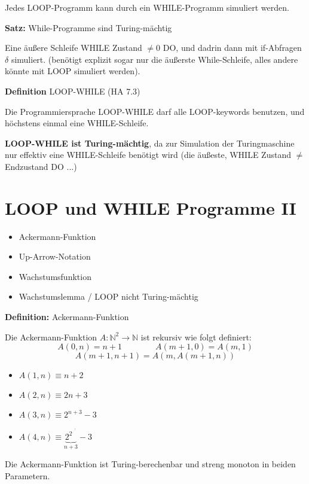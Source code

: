 \documentclass[a4paper,graphics,11pt]{article}
\begin{document}
Jedes LOOP-Programm kann durch ein WHILE-Programm simuliert werden.

\strut

\textbf{Satz:} While-Programme sind Turing-mächtig

Eine äußere Schleife WHILE Zustand $\neq 0$ DO, und dadrin dann mit if-Abfragen $\delta$ simuliert.
(benötigt explizit sogar nur die äußerste While-Schleife, alles andere könnte mit LOOP simuliert werden).

\strut

\textbf{Definition} LOOP-WHILE (HA 7.3)

Die Programmiersprache LOOP-WHILE darf alle LOOP-keywords benutzen, und höchstens einmal
eine WHILE-Schleife.

\textbf{LOOP-WHILE ist Turing-mächtig}, da zur Simulation der Turingmaschine nur effektiv eine WHILE-Schleife
benötigt wird (die äußeste, WHILE Zustand $\neq$ Endzustand DO ...)

\newpage

\section{LOOP und WHILE Programme II}


\begin{itemize}
    \item Ackermann-Funktion
    \item Up-Arrow-Notation
    \item Wachstumsfunktion
    \item Wachstumslemma / LOOP nicht Turing-mächtig
\end{itemize}

\textbf{Definition:} Ackermann-Funktion

Die Ackermann-Funktion $A : \mathbb{N}^2 \to \mathbb{N}$ ist rekursiv wie folgt definiert:
$$
    A(0,n) = n+1
    \qquad\qquad
    A(m+1,0) = A(m,1)
$$$$
    A(m+1,n+1) = A(m, A(m+1,n))
$$
\begin{itemize}
    \item $A(1,n) \equiv n+2$
    \item $A(2,n) \equiv 2n+3$
    \item $A(3,n) \equiv 2^{n+3}-3$
    \item $A(4,n) \equiv \underbrace{2^{2^{.^{.^{.^2}}}}}_{n+3} - 3$
\end{itemize}

Die Ackermann-Funktion ist Turing-berechenbar und streng monoton in beiden Parametern.
\end{document}

